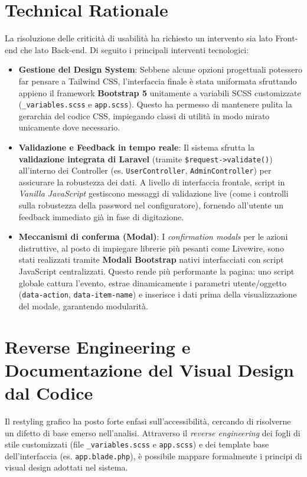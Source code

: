 \section{Technical Rationale}
La risoluzione delle criticità di usabilità ha richiesto un intervento sia lato Front-end che lato Back-end. Di seguito i principali interventi tecnologici:
\begin{itemize}
    \item \textbf{Gestione del Design System}: Sebbene alcune opzioni progettuali potessero far pensare a Tailwind CSS, l'interfaccia finale è stata uniformata sfruttando appieno il framework \textbf{Bootstrap 5} unitamente a variabili SCSS customizzate (\texttt{\_variables.scss} e \texttt{app.scss}). Questo ha permesso di mantenere pulita la gerarchia del codice CSS, impiegando classi di utilità in modo mirato unicamente dove necessario.
    \item \textbf{Validazione e Feedback in tempo reale}: Il sistema sfrutta la \textbf{validazione integrata di Laravel} (tramite \texttt{\$request->validate()}) all'interno dei Controller (es. \texttt{UserController}, \texttt{AdminController}) per assicurare la robustezza dei dati. A livello di interfaccia frontale, script in \textit{Vanilla JavaScript} gestiscono messaggi di validazione live (come i controlli sulla robustezza della password nel configuratore), fornendo all'utente un feedback immediato già in fase di digitazione.
    \item \textbf{Meccanismi di conferma (Modal)}: I \textit{confirmation modals} per le azioni distruttive, al posto di impiegare librerie più pesanti come Livewire, sono stati realizzati tramite \textbf{Modali Bootstrap} nativi interfacciati con script JavaScript centralizzati. Questo rende più performante la pagina: uno script globale cattura l'evento, estrae dinamicamente i parametri utente/oggetto (\texttt{data-action}, \texttt{data-item-name}) e inserisce i dati prima della visualizzazione del modale, garantendo modularità.
\end{itemize}

\section{Reverse Engineering e Documentazione del Visual Design dal Codice}
Il restyling grafico ha posto forte enfasi sull'accessibilità, cercando di risolverne un difetto di base emerso nell'analisi. Attraverso il \textit{reverse engineering} dei fogli di stile customizzati (file \texttt{\_variables.scss} e \texttt{app.scss}) e dei template base dell'interfaccia (es. \texttt{app.blade.php}), è possibile mappare formalmente i principi di visual design adottati nel sistema.

